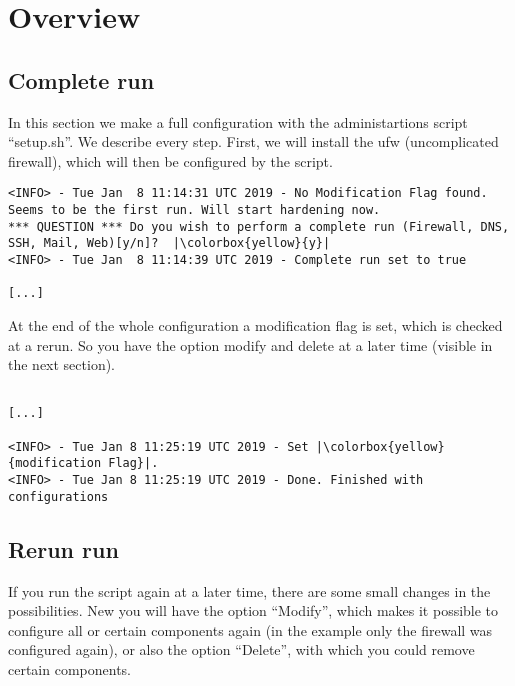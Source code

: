 \section{Overview}
\subsection{Complete run}
In this section we make a full configuration with the administartions script ``setup.sh''. We describe every step. \newline First, we will install the ufw (uncomplicated firewall), which will then be configured by the script.
\begin{lstlisting}[escapeinside=||]
<INFO> - Tue Jan  8 11:14:31 UTC 2019 - No Modification Flag found. Seems to be the first run. Will start hardening now.
*** QUESTION *** Do you wish to perform a complete run (Firewall, DNS, SSH, Mail, Web)[y/n]?  |\colorbox{yellow}{y}|
<INFO> - Tue Jan  8 11:14:39 UTC 2019 - Complete run set to true

[...]

\end{lstlisting}
At the end of the whole configuration a modification flag is set, which is checked at a rerun. So you have the option modify and delete at a later time  (visible in the next section).
\begin{lstlisting}[escapeinside=||]

[...]

<INFO> - Tue Jan 8 11:25:19 UTC 2019 - Set |\colorbox{yellow}{modification Flag}|.
<INFO> - Tue Jan 8 11:25:19 UTC 2019 - Done. Finished with configurations

\end{lstlisting}

\newpage
\subsection{Rerun run}
If you run the script again at a later time, there are some small changes in the possibilities. New you will have the option ``Modify'', which makes it possible to configure all or certain components again (in the example only the firewall was configured again), or also the option ``Delete'', with which you could remove certain components.

